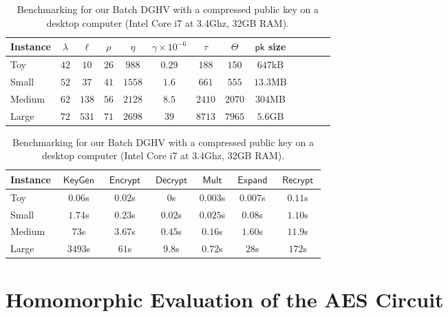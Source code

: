 \documentclass[11pt]{llncs}
\DeclareMathOperator{\KeyGen}{\ensuremath{\mathsf{KeyGen}}}
\DeclareMathOperator{\Expand}{\ensuremath{\mathsf{Expand}}}
\DeclareMathOperator{\Encrypt}{\ensuremath{\mathsf{Encrypt}}}
\DeclareMathOperator{\Decrypt}{\ensuremath{\mathsf{Decrypt}}}
\DeclareMathOperator{\Recrypt}{\ensuremath{\mathsf{Recrypt}}}
\DeclareMathOperator{\Mult}{\ensuremath{\mathsf{Mult}}}
\newcommand*{\pk}{\ensuremath{\mathsf{pk}}}
\begin{document}
\begin{table}[tb]\scriptsize

\qquad\qquad\qquad\qquad\begin{tabular}{|l|c|c||c|c|c|c|c|c|c|c|c||r|}
\hline 
\textbf{Instance}&$\lambda$&$\ell$&$\rho$&$\eta$&$\gamma\times 10^{-6}$&$\tau$&$\Theta$&$\pk$ size\\
\hline
\hline
Toy&$42$&$10$&$26$&$988$&$0.29$&$188$&$150$&$647$kB\\\hline
Small&$52$&$37$&$41$&$1558$&$1.6$&$661$&$555$&$13.3$MB\\\hline
Medium&$62$&$138$&$56$&$2128$&$8.5$&$2410$&$2070$&$304$MB\\\hline
Large&$72$&$531$&$71$&$2698$&$39$&$8713$&$7965$&$5.6$GB\\\hline
\end{tabular}

\medskip
\qquad\qquad\qquad\qquad\begin{tabular}{|l|c|c|c|c|c|c|}
\hline 
\textbf{Instance}&$\KeyGen$&$\Encrypt$&$\Decrypt$&$\Mult$&$\Expand$ & $\Recrypt$\\
\hline
\hline
Toy&$0.06$s&$0.02$s&$0$s&$0.003$s&$0.007$s&$0.11$s\\\hline
Small&$1.74$s&$0.23$s&$0.02$s&$0.025$s&$0.08$s&$1.10$s\\\hline
Medium&$73$s&$3.67$s&$0.45$s&$0.16$s&$1.60$s&$11.9$s\\\hline
Large&$3493$s&$61$s&$9.8$s&$0.72$s&$28$s&$172$s\\\hline
\end{tabular}\newline
\caption{Benchmarking for our Batch DGHV with a compressed public key
  on a desktop computer (Intel Core i7 at 3.4Ghz, 32GB RAM).}
\label{t:concparams}
  \vspace{-0.5cm}
\end{table}


\section{Homomorphic Evaluation of the AES Circuit}
\label{sec:HAES}
\end{document}
